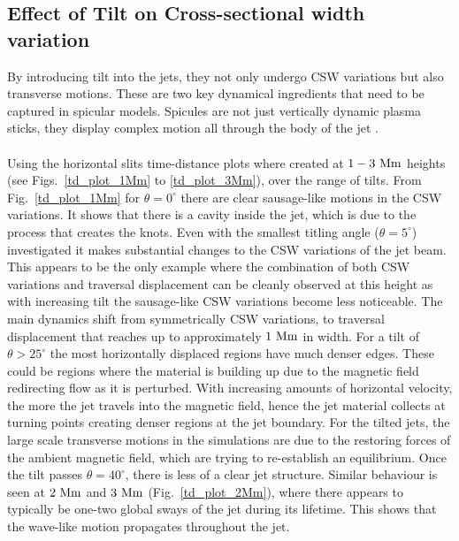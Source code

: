 \documentclass[12pt]{ociamthesis}
\newcommand{\np}{\\ \\}
\newcommand{\degs}{^{\circ}}
\begin{document}
\subsection{Effect of Tilt on Cross-sectional width variation}
\label{subsec:oscillating}
By introducing tilt into the jets, they not only undergo CSW variations but also transverse motions. These are two key dynamical ingredients that need to be captured in spicular models. Spicules are not just vertically dynamic plasma sticks, they display complex motion all through the body of the jet \citep{Sharma2018ApJ85361S}. \np
%
Using the horizontal slits time-distance plots where created at $1-3~\rm{Mm}$ heights (see Figs.~\ref{td_plot_1Mm} to \ref{td_plot_3Mm}), over the range of tilts. From Fig.~\ref{td_plot_1Mm} for $\theta=0^{\circ}$ there are clear sausage-like motions in the CSW variations. It shows that there is a cavity inside the jet, which is due to the process that creates the knots. Even with the smallest titling angle ($\theta=5\degs$) investigated it makes substantial changes to the CSW variations of the jet beam. This appears to be the only example where the combination of both CSW variations and traversal displacement can be cleanly observed at this height as with increasing tilt the sausage-like CSW variations become less noticeable. The main dynamics shift from symmetrically CSW variations, to traversal displacement that reaches up to approximately $1~\rm{Mm}$ in width. For a tilt of $\theta>25\degs$ the most horizontally displaced regions have much denser edges. These could be regions where the material is building up due to the magnetic field redirecting flow as it is perturbed. With increasing amounts of horizontal velocity, the more the jet travels into the magnetic field, hence the jet material collects at turning points creating denser regions at the jet boundary. For the tilted jets, the large scale transverse motions in the simulations are due to the restoring forces of the ambient magnetic field, which are trying to re-establish an equilibrium. Once the tilt passes $\theta=40\degs$, there is less of a clear jet structure. Similar behaviour is seen at $2~\rm{Mm}$ and $3~\rm{Mm}$ (Fig.~\ref{td_plot_2Mm}), where there appears to typically be one-two global sways of the jet during its lifetime. This shows that the wave-like motion propagates throughout the jet. \np
%
\end{document}
